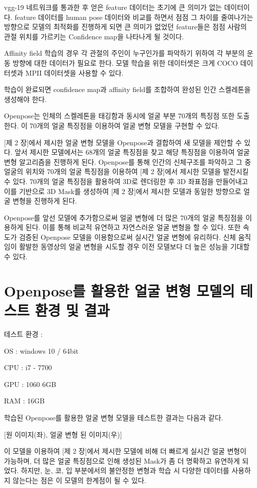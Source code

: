 \documentclass{oblivoir}
\begin{document}
vgg-19 네트워크를 통과한 후 얻은 feature 데이터는 초기에 큰 의미가 없는 데이터이다. feature 데이터를 human pose 데이터와 비교를 하면서 점점 그 차이를 줄여나가는 방향으로 모델의 최적화를 진행하게 되면 큰 의미가 없었던 feature들은 점점 사람의 관절 위치를 가르키는 Confidence map을 나타나게 될 것이다.

Affinity field 학습의 경우 각 관절의 주인이 누구인가를 파악하기 위하여 각 부분의 운동 방향에 대한 데이터가 필요로 한다. 모델 학습을 위한 데이터셋은 크게 COCO 데이터셋과 MPII 데이터셋을 사용할 수 있다.

학습이 완료되면 confidence map과 affinity field를 조합하여 완성된 인간 스켈레톤을 생성해야 한다.

Openpose는 인체의 스켈레톤을 태깅함과 동시에 얼굴 부분 70개의 특징점 또한 도출 한다. 이 70개의 얼굴 특징점을 이용하여 얼굴 변형 모델을 구현할 수 있다.

[제 2 장]에서 제시한 얼굴 변형 모델을 Openpose과 결합하여 새 모델을 제안할 수 있다. 앞서 제시한 모델에서는 68개의 얼굴 특징점을 찾고 해당 특징점을 이용하여 얼굴 변형 알고리즘을 진행하게 된다. Openpose를 통해 인간의 신체구조를 파악하고 그 중 얼굴의 위치와 70개의 얼굴 특징점을 이용하여 [제 2 장]에서 제시한 모델을 발전시킬 수 있다. 70개의 얼굴 특징점을 활용하여 3D로 렌더링한 후 3D 좌표점을 만들어내고 이를 기반으로 3D Mask를 생성하여 [제 2 장]에서 제시한 모델과 동일한 방향으로 얼굴 변형을 진행하게 된다.

Openpose를 앞선 모델에 추가함으로써 얼굴 변형에 더 많은 70개의 얼굴 특징점을 이용하게 된다. 이를 통해 비교적 유연하고 자연스러운 얼굴 변형을 할 수 있다. 또한 속도가 검증된 Openpose 모델을 이용함으로써 실시간 얼굴 변형에 유리하다. 신체 움직임이 활발한 동영상의 얼굴 변형을 시도할 경우 이전 모델보다 더 높은 성능을 기대할 수 있다.

   \section{Openpose를 활용한 얼굴 변형 모델의 테스트 환경 및 결과}

테스트 환경 :

OS : windows 10 / 64bit

CPU : i7 - 7700

GPU : 1060 6GB

RAM : 16GB

학습된 Openpose를 활용한 얼굴 변형 모델을 테스트한 결과는 다음과 같다.

[원 이미지(좌), 얼굴 변형 된 이미지(우)]

이 모델을 이용하여 [제 2 장]에서 제시한 모델에 비해 더 빠르게 실시간 얼굴 변형이 가능하며, 더 많은 얼굴 특징점으로 인해 생성된 Mask가 좀 더 명확하고 유연하게 되었다. 하지만, 눈, 코, 입 부분에서의 불안정한 변형과 학습 시 다양한 데이터를 사용하지 않는다는 점은 이 모델의 한계점이 될 수 있다.
\end{document}
